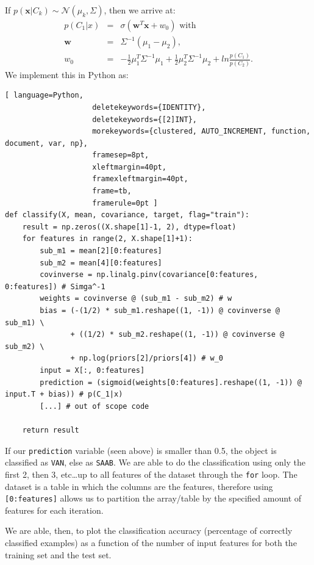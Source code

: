 \documentclass[a4paper,11pt,oneside]{article}
\begin{document}
If $p(\textbf{x}|C_k) \sim \mathcal{N}(\mu_k, \Sigma)$, then we arrive at:
\begin{eqnarray*}
p(C_1|x)	&	=	&	\sigma(\textbf{w}^T\textbf{x} + w_0) \textrm{ with}\\
\textbf{w}	&	=	&	\Sigma^{-1}(\mu_1 - \mu_2)\textrm{,}\\
w_0	&	=	&	-\frac{1}{2}\mu_1^T\Sigma^{-1}\mu_1 + \frac{1}{2}\mu_2^T\Sigma^{-1}\mu_2 + ln\frac{p(C_1)}{p(C_2)}\textrm{.}
\end{eqnarray*}
We implement this in Python as:
\begin{lstlisting}[ language=Python,
                    deletekeywords={IDENTITY},
                    deletekeywords={[2]INT},
                    morekeywords={clustered, AUTO_INCREMENT, function, document, var, np},
                    framesep=8pt,
                    xleftmargin=40pt,
                    framexleftmargin=40pt,
                    frame=tb,
                    framerule=0pt ]
def classify(X, mean, covariance, target, flag="train"):
    result = np.zeros((X.shape[1]-1, 2), dtype=float)
    for features in range(2, X.shape[1]+1):
        sub_m1 = mean[2][0:features]
        sub_m2 = mean[4][0:features]
        covinverse = np.linalg.pinv(covariance[0:features, 0:features]) # Simga^-1
        weights = covinverse @ (sub_m1 - sub_m2) # w
        bias = (-(1/2) * sub_m1.reshape((1, -1)) @ covinverse @ sub_m1) \
               + ((1/2) * sub_m2.reshape((1, -1)) @ covinverse @ sub_m2) \
               + np.log(priors[2]/priors[4]) # w_0
        input = X[:, 0:features]
        prediction = (sigmoid(weights[0:features].reshape((1, -1)) @ input.T + bias)) # p(C_1|x)
        [...] # out of scope code

    return result
\end{lstlisting}

If our \texttt{prediction} variable (seen above) is smaller than 0.5, the object is classified as \texttt{VAN}, else as \texttt{SAAB}. We are able to do the classification using only the first 2, then 3, etc\dots up to all features of the dataset through the \texttt{for} loop. The dataset is a table in which the columns are the features, therefore using \texttt{[0:features]} allows us to partition the array/table by the specified amount of features for each iteration. 

We are able, then, to plot the classification accuracy (percentage of correctly classified examples) as a function of the number of input features for both the training set and the test set. 
\end{document}
